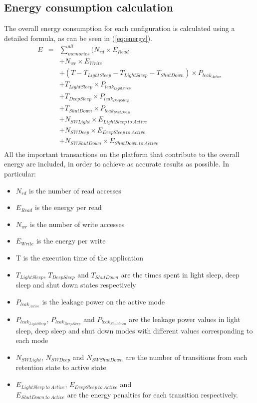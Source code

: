 \documentclass[a4paper,conference]{IEEEtran}
\begin{document}
\subsection{Energy consumption calculation}
The overall energy consumption for each configuration is calculated using a detailed formula, as can be seen in (\ref{eq:energy}). 
\setlength{\arraycolsep}{0.0em}
\begin{eqnarray}
\label{eq:energy}
 E &{}= {}&\sum\limits_{memories}^{all}  ( N_{rd} \times E_{Read} \nonumber\\
		&&+ N_{wr} \times E_{Write} \nonumber\\
		&&+ (T - T_{LightSleep} - T_{LightSleep} - T_{ShutDown}) \times P_{leak_{Active}} \nonumber\\
		&&+ T_{LightSleep} \times P_{leak_{LightSleep}} \nonumber\\
		&&+ T_{DeepSleep} \times P_{leak_{DeepSleep}} \nonumber\\
		&&+ T_{ShutDown} \times P_{leak_{ShutDown}} \nonumber\\ 
		&& + N_{SWLight} \times E_{LightSleep \: to \: Active} \nonumber\\
		&& + N_{SWDeep} \times E_{DeepSleep \: to \: Active} \nonumber\\
		&& + N_{SWShutDown} \times E_{ShutDown \: to \: Active} \nonumber\\
\end{eqnarray}
\setlength{\arraycolsep}{5pt}
All the important transactions on the platform that contribute to the overall energy are included, in order to achieve as accurate results as possible. In particular:
\begin{itemize}
\item $N_{rd}$ is the number of read accesses
\item $E_{Read}$ is the energy per read
\item $N_{wr}$ is the number of write accesses 
\item $E_{Write}$ is the energy per write 
\item T is the execution time of the application
\item $T_{LightSleep}$, $T_{DeepSleep}$ and $T_{ShutDown}$ are the times spent in light sleep, deep sleep and shut down states respectively
\item $P_{leak_{Active}}$ is the leakage power on the active mode 
\item $P_{leak_{LightSleep}}$, $P_{leak_{DeepSleep}}$ and $P_{leak_{Shutdown}}$ are the leakage power values in light sleep, deep sleep and shut down modes with different values corresponding to each mode 
\item $N_{SWLight}$, $N_{SWDeep}$ and $N_{SWShutDown}$ are the number of transitions from each retention state to active state
\item $E_{LightSleep \: to \: Active}$, $E_{DeepSleep \: to \: Active}$ and \\ $E_{ShutDown \: to \: Active}$  are the energy penalties for each transition respectively.
\end{itemize}
\end{document}
